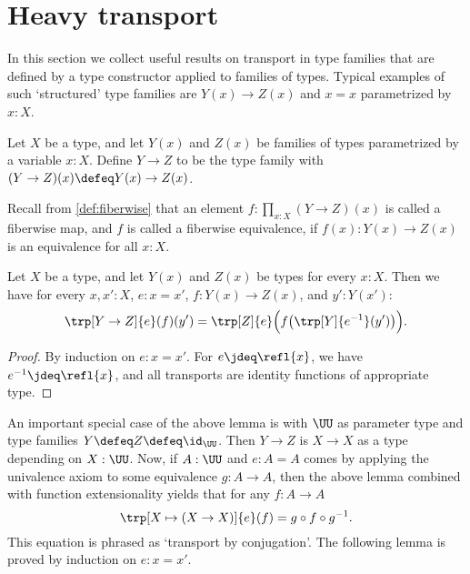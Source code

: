 \section{Heavy transport}
\label{sec:heavy-transport}

In this section we collect useful results on transport in
type families that are defined by a type constructor applied
to families of types.
Typical examples of such `structured' type families are
$Y(x)\to Z(x)$ and $x=x$ parametrized by $x:X$.

\begin{definition}\label{def:function-type-families}
Let $X$ be a type, and let $Y(x)$ and $Z(x)$ be families of types parametrized by a variable $x:X$.
Define $Y\to Z$ to be the type family
with $(Y\to Z)(x) \defeq Y(x)\to Z(x)$.
\end{definition}
Recall from \cref{def:fiberwise} that an element $f : \prod_{x:X}(Y\to Z)(x)$
is called a fiberwise map,
and $f$ is called a fiberwise equivalence,
if $f(x): Y(x)\to Z(x)$ is an equivalence for all $x:X$.

\begin{lemma}\label{lem:trp-in-function-type}
Let $X$ be a type, and let $Y(x)$ and $Z(x)$ be types for every $x:X$.
Then we have for every $x,x':X$, $e: x=x'$, $f: Y(x)\to Z(x)$, and $y':Y(x')$:
\[
\trp[Y\to Z]{ e} (f)(y') = \trp[Z]{e} \Bigl(f\bigl(\trp[Y]{ e^{-1}}(y')\bigr)\Bigr).
\]
\end{lemma}
\begin{proof}
By induction on $e: x=x'$. For $e \jdeq \refl{x}$, we have $e^{-1}\jdeq \refl{x}$,
and all transports are identity functions of appropriate type.
\end{proof}

An important special case of the above lemma is with $\UU$
as parameter type and type families $Y\defeq Z\defeq \id_\UU$.
Then $Y\to Z$ is $X\to X$ as a type depending on $X:\UU$. Now,
if $A:\UU$ and $e: A=A$ comes by applying the univalence axiom to some equivalence
$g:A\to A$, then the above lemma combined with function extensionality
yields that for any $f: A\to A$
\[
\trp[X \mapsto (X\to X)]{e} (f) = g\circ f \circ g^{-1}.
\]
This equation is phrased as `transport by conjugation'.
The following lemma is proved by induction on $e: x=x'$.

